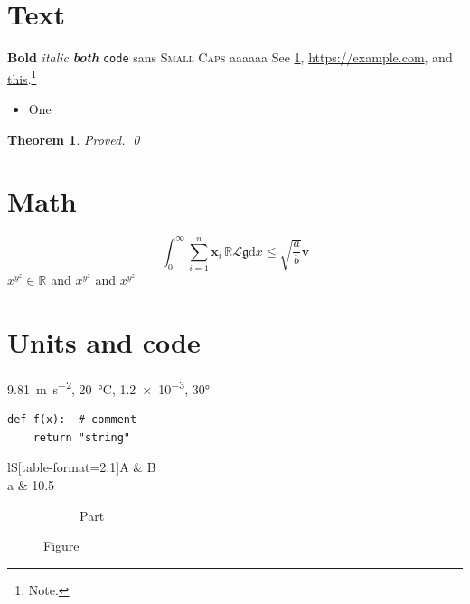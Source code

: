 \documentclass{article}
\newtheorem{theorem}{Theorem}
\begin{document}
\tableofcontents
\section{Text}\label{sec:text}
\textbf{Bold} \textit{italic} \emph{\textbf{both}} \texttt{code} \textsf{sans}
\textsc{Small Caps} {\tiny a}{\footnotesize a}{\small a}{\large a}{\Large a}{\Huge a}
See \cref{sec:text}, \url{https://example.com}, and \href{https://example.com}{this}.\footnote{Note.}
\begin{itemize}[nosep]\item One\end{itemize}
\begin{theorem}Proved. \qed\end{theorem}
\section{Math}
\begin{equation}\label{eq}
\int_0^\infty \sum_{i=1}^n \bm{x}_i\,\mathbb{R}\mathcal{L}\mathfrak{g}\mathrm{d}x \leq \sqrt{\frac{a}{b}} \mathbf{v}
\end{equation}
$x^{y^z} \in \mathbb{R}$ and {\small $x^{y^z}$} and {\large $x^{y^z}$}
\section{Units and code}
\SI{9.81}{\metre\per\second\squared}, \qty{20}{\celsius}, \num{1.2e-3}, \ang{30}
\begin{lstlisting}
def f(x):  # comment
    return "string"
\end{lstlisting}
\begin{table}[h]\centering
\begin{tabular}{lS[table-format=2.1]}\toprule A & {B} \\\midrule a & 10.5 \\\bottomrule\end{tabular}
\caption{Table}\end{table}
\begin{figure}[h]\centering
\begin{subfigure}{.4\textwidth}
\caption{Part}\end{subfigure}
\caption{Figure}\end{figure}
\end{document}
